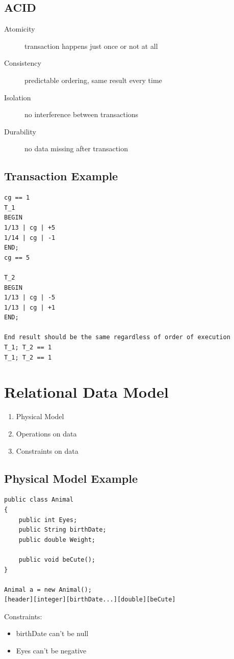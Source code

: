 \documentclass{article}
\begin{document}
\subsection{ACID}
\begin{samepage}
\begin{description}
    \item[Atomicity] transaction happens just once or not at all
    \item[Consistency] predictable ordering, same result every time
    \item[Isolation] no interference between transactions
    \item[Durability] no data missing after transaction
\end{description}
\end{samepage}

\subsection{Transaction Example}
\begin{verbatim}
cg == 1
T_1
BEGIN
1/13 | cg | +5
1/14 | cg | -1
END;
cg == 5

T_2
BEGIN
1/13 | cg | -5
1/13 | cg | +1
END;

End result should be the same regardless of order of execution
T_1; T_2 == 1
T_1; T_2 == 1

\end{verbatim}

\section{Relational Data Model}
\begin{enumerate}
    \item{Physical Model}
    \item{Operations on data}
    \item{Constraints on data}
\end{enumerate}

\subsection{Physical Model Example}
\begin{samepage}
\begin{lstlisting}
public class Animal
{
    public int Eyes;
    public String birthDate;
    public double Weight;

    public void beCute();
}

Animal a = new Animal();
[header][integer][birthDate...][double][beCute]
\end{lstlisting}

Constraints:
\begin{itemize}
    \item{birthDate can't be null}
    \item{Eyes can't be negative}
\end{itemize}
\end{samepage}
\end{document}
